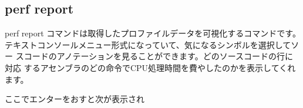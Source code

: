\documentclass[mingoth,a4paper]{jsarticle}
\begin{document}
\subsection{perf report}

perf report コマンドは取得したプロファイルデータを可視化するコマンドです。
テキストコンソールメニュー形式になっていて、気になるシンボルを選択してソー
スコードのアノテーションを見ることができます。どのソースコードの行に対応
するアセンブラのどの命令でCPU処理時間を費やしたのかを表示してくれます。


ここでエンターをおすと次が表示され
\end{document}
